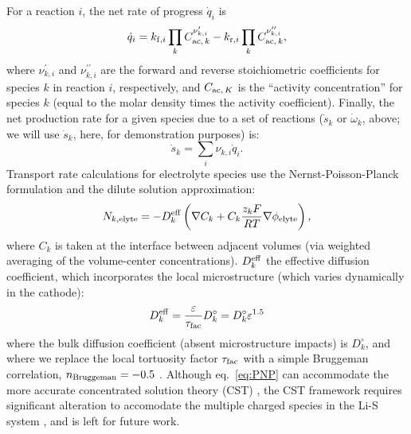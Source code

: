 \documentclass{elsarticle}
\begin{document}
For a reaction $i$, the net rate of progress $\dot{q}_i$ is
\begin{equation}\label{eq:rop_net}
    \dot{q}_i = k_{{\rm f},i}\prod_k C_{{\rm ac},\,k}^{\nu^\prime_{k,i}} -  k_{{\rm r},i}\prod_k C_{{\rm ac},\,k}^{\nu^{\prime\prime}_{k,i}},
\end{equation}
where $\nu^\prime_{k,i}$ and  $\nu^{\prime\prime}_{k,i}$ are the forward and reverse stoichiometric coefficients for species $k$ in reaction $i$, respectively, and $C_{{\rm ac},\,K}$ is the ``activity concentration'' for species $k$ (equal to the molar density times the activity coefficient).  Finally, the net production rate for a given species due to a set of reactions ($\dot{s}_k$ or $\dot{\omega}_k$, above; we will use $\dot{s}_k$, here, for demonstration purposes) is:
\begin{equation}\label{eq:net_prod_rate}
    \dot{s}_k = \sum_i \nu_{k,i}\dot{q}_i.
\end{equation}
Transport rate calculations for electrolyte species use the Nernst-Poisson-Planck formulation and the dilute solution approximation:
\begin{equation}\label{eq:PNP}
    N_{k,{\rm elyte}} = -D_k^{\rm eff}\left(\nabla C_k + C_k\frac{z_kF}{RT}\nabla \phi_{\rm elyte}\right),
\end{equation}
where $C_k$ is taken at the interface between adjacent volumes (via weighted averaging of the volume-center concentrations). $D^{\rm eff}_k$ the effective diffusion coefficient, which incorporates the local microstructure (which varies dynamically in the cathode):
\begin{equation}\label{eq:Dk_eff}
    D^{\rm eff}_k = \frac{\varepsilon}{\tau_{\rm fac}}D^\circ_k = D^\circ_k\varepsilon^{1.5}
\end{equation}
where the bulk diffusion coefficient (absent microstructure impacts) is $D^\circ_k$, and where we replace the local tortuosity factor $\tau_{\rm fac}$ with a simple Bruggeman correlation, $n_{\rm Bruggeman} = -0.5$ \cite{TJADEN201644}.  Although eq.~\ref{eq:PNP} can accommodate the more accurate concentrated solution theory (CST) \cite{Kupper_2016}, the CST framework requires significant alteration to accomodate the multiple charged species in the Li-S system \cite{mukherjee2018}, and is left for future work.
\end{document}

